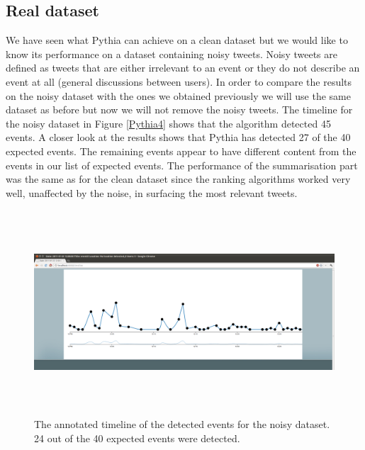 \subsection{Real dataset}
We have seen what Pythia can achieve on a clean dataset but we would like to know its performance on a dataset containing noisy tweets. Noisy tweets are defined as tweets that are either irrelevant to an event or they do not describe an event at all (general discussions between users). In order to compare the results on the noisy dataset with the ones we obtained previously we will use the same dataset as before but now we will not remove the noisy tweets. The timeline for the noisy dataset in Figure \ref{Pythia4} shows that the algorithm detected 45 events. A closer look at the results shows that Pythia has detected 27 of the 40 expected events. The remaining events appear to have different content from the events in our list of expected events. The performance of the summarisation part was the same as for the clean dataset since the ranking algorithms worked very well, unaffected by the noise, in surfacing the most relevant tweets.   
\begin{figure}[htbp]
  \begin{center}
    \includegraphics[height=3in, width=6in]{pythia5}
    \caption{The annotated timeline of the detected events for the noisy dataset. 24 out of the 40 expected events were detected.}
    \label{Pythia5}
  \end{center}
\end{figure} 

